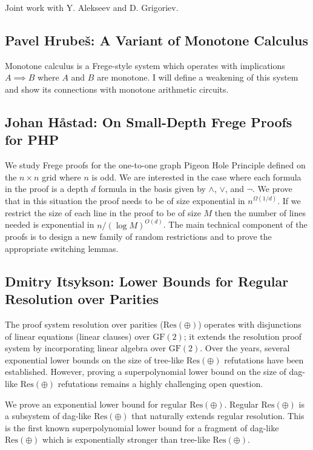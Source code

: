 \documentclass[11pt]{article}
\begin{document}
Joint work with Y. Alekseev and D. Grigoriev.
\subsection*{Pavel Hrube\v{s}: A Variant of Monotone Calculus}\label{Hrubes}

Monotone calculus is a Frege-style system which operates with implications $A\implies B$ where $A$ and $B$ are monotone. I will define a weakening of this system and show its connections with monotone arithmetic circuits.


\subsection*{Johan H\aa stad: On Small-Depth Frege Proofs for PHP}\label{Hastad}

We study Frege proofs for the one-to-one graph Pigeon Hole Principle
defined on the $n\times n$ grid where $n$ is odd.
We are interested in the case where each formula
in the proof is a depth $d$ formula in the basis given by
$\land$, $\lor$, and $\neg$. We prove that in this situation the
proof needs to be of size exponential in $n^{\Omega (1/d)}$.
If we restrict the size of each line in the proof to be of
size $M$ then the number of lines needed is exponential
in $n/(\log M)^{O(d)}$.   The main technical component of
the proofs is to design a new family of random restrictions
and to prove the appropriate switching lemmas.

\subsection*{Dmitry Itsykson: Lower Bounds for Regular Resolution over Parities}\label{Itsykson}

The proof system resolution over parities ($\mathrm{Res}(\oplus)$) operates with disjunctions of linear equations (linear clauses) over $\mathrm{GF}(2)$; it extends the resolution proof system by incorporating linear algebra over $\mathrm{GF}(2)$. Over the years, several exponential lower bounds on the size of tree-like $\mathrm{Res}(\oplus)$ refutations have been established. However, proving a superpolynomial lower bound on the size of dag-like $\mathrm{Res}(\oplus)$ refutations remains a highly challenging open question.

We prove an exponential lower bound for regular $\mathrm{Res}(\oplus)$. Regular $\mathrm{Res}(\oplus)$ is a subsystem of dag-like $\mathrm{Res}(\oplus)$ that naturally extends regular resolution. This is the first known superpolynomial lower bound for a fragment of dag-like $\mathrm{Res}(\oplus)$ which is exponentially stronger than tree-like $\mathrm{Res}(\oplus)$.
\end{document}

